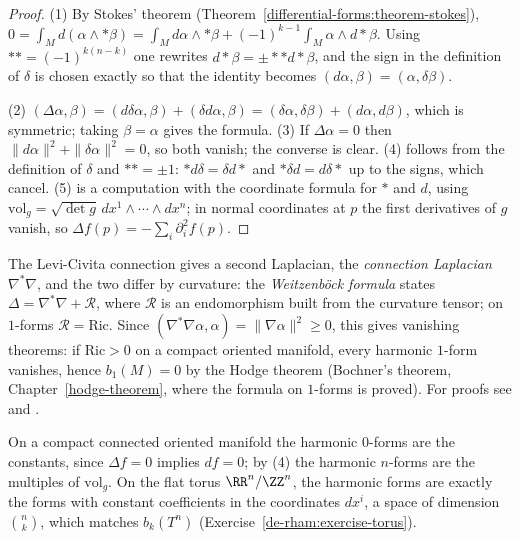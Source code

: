 \begin{proof}
(1) By Stokes' theorem (Theorem~\ref{differential-forms:theorem-stokes}), $0 = \int_Md(\alpha \wedge *\beta) = \int_Md\alpha \wedge *\beta + (-1)^{k-1}\int_M\alpha \wedge d{*}\beta$. Using $** = (-1)^{k(n-k)}$ one
rewrites $d*\beta = \pm *{*}d{*}\beta$, and the sign in the definition of $\delta$ is chosen exactly so that the identity becomes $(d\alpha, \beta) = (\alpha, \delta\beta)$.

(2) $(\Delta\alpha, \beta) = (d\delta\alpha, \beta) + (\delta d\alpha, \beta) = (\delta\alpha, \delta\beta) + (d\alpha, d\beta)$, which is symmetric; taking $\beta = \alpha$ gives the formula. (3) If $\Delta\alpha = 0$ then
$\|d\alpha\|^2 + \|\delta\alpha\|^2 = 0$, so both vanish; the converse is clear. (4) follows from the definition of $\delta$ and $** = \pm 1$: $*d\delta = \delta d*$ and $*\delta d = d\delta*$ up to the signs, which
cancel. (5) is a computation with the coordinate formula for $*$ and $d$, using $\mathrm{vol}_g = \sqrt{\det g}\,dx^1\wedge\cdots\wedge dx^n$; in normal coordinates at $p$ the first derivatives of $g$ vanish, so
$\Delta f(p) = -\sum_i\partial_i^2f(p)$.
\end{proof}

\begin{remark}\label{riemannian-geometry:remark-weitzenbock}
The Levi-Civita connection gives a second Laplacian, the \emph{connection Laplacian} $\nabla^*\nabla$, and the two differ by curvature: the \emph{Weitzenb\"ock formula} states
$\Delta = \nabla^*\nabla + \mathcal{R}$, where $\mathcal{R}$ is an endomorphism built from the curvature tensor; on $1$-forms $\mathcal{R} = \mathrm{Ric}$. Since $(\nabla^*\nabla\alpha, \alpha) = \|\nabla\alpha\|^2 \geq 0$,
this gives vanishing theorems: if $\mathrm{Ric} > 0$ on a compact oriented manifold, every harmonic $1$-form vanishes, hence $b_1(M) = 0$ by the Hodge theorem (Bochner's theorem,
Chapter~\ref{hodge-theorem}, where the formula on $1$-forms is proved). For proofs see \cite[Chapter 6]{warner-foundations} and \cite[Chapter 4]{lee-riemannian}.
\end{remark}

\begin{example}\label{riemannian-geometry:example-harmonic-forms}
On a compact connected oriented manifold the harmonic $0$-forms are the constants, since $\Delta f = 0$ implies $df = 0$; by (4) the harmonic $n$-forms are the multiples of $\mathrm{vol}_g$. On the flat torus
$\RR^n/\ZZ^n$, the harmonic forms are exactly the forms with constant coefficients in the coordinates $dx^i$, a space of dimension $\binom{n}{k}$, which matches $b_k(T^n)$
(Exercise~\ref{de-rham:exercise-torus}).
\end{example}

